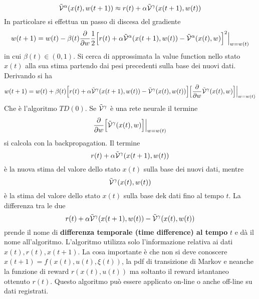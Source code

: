 \begin{equation}
\tilde{\mathcal{V}}^\alpha (x(t), w(t+1)) \approx r(t) + \alpha \tilde{\mathcal{V}}^\gamma (x(t+1), w(t))
\end{equation} In particolare si effettua un passo di discesa del gradiente
\begin{equation}
w(t+1) = w(t) - \beta(t) \frac{\partial}{\partial w} \frac{1}{2} \Big [ r(t) + \alpha \tilde{\mathcal{V}}^\alpha (x(t+1), w(t)) - \tilde{\mathcal{V}}^\alpha (x(t), w) \Big ]^2 \Big |_{w=w(t)}
\end{equation} in cui $\beta(t) \in (0,1)$. Si cerca di approssimata la value function nello stato $x(t)$ alla sua stima partendo dai pesi precedenti sulla base dei nuovi dati. Derivando si ha
\begin{equation}
w(t+1) = w(t) + \beta(t) \Big [ r(t) + \alpha \tilde{\mathcal{V}}^\gamma (x(t+1), w(t)) - \tilde{\mathcal{V}}^\gamma(x(t), w(t)) \Big ] \Big [ \frac{\partial}{\partial w} \tilde{\mathcal{V}}^\gamma (x(t),w) \Big ] \Big |_{w=w(t)}
\end{equation} Che \`e l'algoritmo $TD(0)$. Se $\tilde{\mathcal{V}}^\gamma$ \`e una rete neurale il termine
\begin{equation}
\frac{\partial}{\partial w} \Big [ \tilde{\mathcal{V}}^\gamma (x(t),w) \Big ] \Big |_{w=w(t)}
\end{equation} si calcola con la backpropagation. Il termine
\begin{equation}
r(t) + \alpha \tilde{\mathcal{V}}^\gamma (x(t+1), w(t))
\end{equation} \`e la nuova stima del valore dello stato $x(t)$ sulla base dei nuovi dati, mentre
\begin{equation}
\tilde{\mathcal{V}}^\gamma (x(t), w(t))
\end{equation} \`e la stima del valore dello stato $x(t)$ sulla base dek dati fino al tempo $t$. La differenza tra le due
\begin{equation}
r(t) + \alpha \tilde{\mathcal{V}}^\gamma (x(t+1), w(t)) - \tilde{\mathcal{V}}^\gamma (x(t), w(t))
\end{equation} prende il nome di \textbf{differenza temporale (time difference) al tempo }$t$ e d\`a il nome all'algoritmo. L'algoritmo utilizza solo l'informazione relativa ai dati $x(t), r(t), x(t+1)$. La cosa importante \`e  che non si deve conoscere $x(t+1) = f(x(t), u(t), \xi(t))$, la pdf di transizione di Markov e neanche la funzione di reward $r(x(t), u(t))$ ma soltanto il reward istantaneo ottenuto $r(t)$. Questo algoritmo pu\`o essere applicato on-line o anche off-line su dati registrati.

